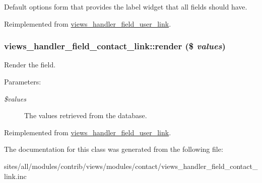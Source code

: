 Default options form that provides the label widget that all fields should have. 

Reimplemented from \hyperlink{classviews__handler__field__user__link_952944015feaaab1fb2d0abc29d5c2b5}{views\_\-handler\_\-field\_\-user\_\-link}.\hypertarget{classviews__handler__field__contact__link_08fa45e6542168dfe0dcdd9f59f7ad45}{
\subsubsection[{render}]{\setlength{\rightskip}{0pt plus 5cm}views\_\-handler\_\-field\_\-contact\_\-link::render (\$ {\em values})}}
\label{classviews__handler__field__contact__link_08fa45e6542168dfe0dcdd9f59f7ad45}


Render the field.

\begin{Desc}
\item[Parameters:]
\begin{description}
\item[{\em \$values}]The values retrieved from the database. \end{description}
\end{Desc}


Reimplemented from \hyperlink{classviews__handler__field__user__link_f81b37cfa8e0c2363ad8ed9bb601cd14}{views\_\-handler\_\-field\_\-user\_\-link}.

The documentation for this class was generated from the following file:\begin{CompactItemize}
\item 
sites/all/modules/contrib/views/modules/contact/views\_\-handler\_\-field\_\-contact\_\-link.inc\end{CompactItemize}
